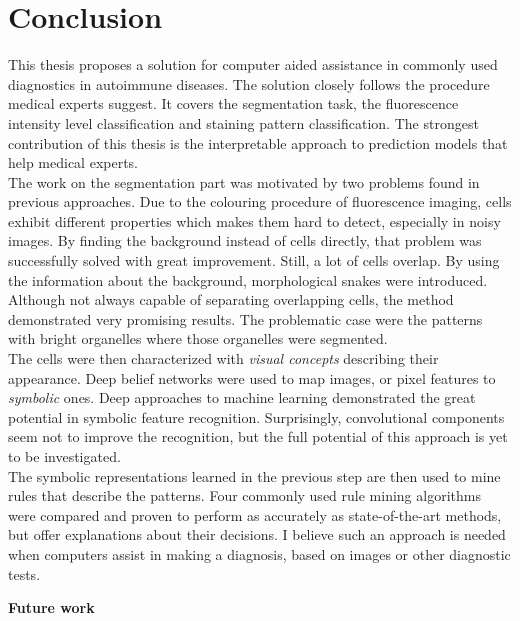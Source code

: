 \chapter{Conclusion}

\label{Conclusion}

This thesis proposes a solution for computer aided assistance in commonly used diagnostics in autoimmune diseases. The solution closely follows the procedure medical experts suggest. It covers the segmentation task,  the fluorescence intensity level classification and staining pattern classification. The strongest contribution of this thesis is the interpretable approach to prediction models that help medical experts. \\

The work on the segmentation part was motivated by two problems found in previous approaches. Due to the colouring procedure of fluorescence imaging, cells exhibit different properties which makes them hard to detect, especially in noisy images. By finding the background instead of cells directly, that problem was successfully solved with great improvement. Still, a lot of cells overlap.  By using the information about the background, morphological snakes were introduced. Although not always capable of separating overlapping cells, the method demonstrated very promising results. The problematic case were the patterns with bright organelles where those organelles were segmented. \\

The cells were then characterized with \textit{visual concepts} describing their appearance. Deep belief networks were used to map images, or pixel features to \textit{symbolic} ones. Deep approaches to machine learning demonstrated the great potential in symbolic feature recognition. Surprisingly, convolutional components seem not to improve the recognition, but the full potential of this approach is yet to be investigated. \\

The symbolic representations learned in the previous step are then used to mine rules that describe the patterns. Four commonly used rule mining algorithms were compared and proven to perform as accurately as state-of-the-art methods, but offer explanations about their decisions. I believe such an approach is needed when computers assist in making a diagnosis, based on images or other diagnostic tests.

\begin{flushleft}
	\large
	\vspace{15pt}
	\textbf{Future work}
\end{flushleft}

